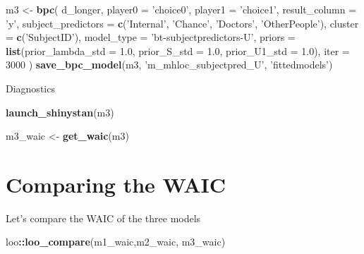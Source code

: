 \documentclass[
]{book}
\newenvironment{Shaded}{\begin{snugshade}}{\end{snugshade}}
\newcommand{\DataTypeTok}[1]{\textcolor[rgb]{0.13,0.29,0.53}{#1}}
\newcommand{\DecValTok}[1]{\textcolor[rgb]{0.00,0.00,0.81}{#1}}
\newcommand{\FloatTok}[1]{\textcolor[rgb]{0.00,0.00,0.81}{#1}}
\newcommand{\KeywordTok}[1]{\textcolor[rgb]{0.13,0.29,0.53}{\textbf{#1}}}
\newcommand{\NormalTok}[1]{#1}
\newcommand{\OperatorTok}[1]{\textcolor[rgb]{0.81,0.36,0.00}{\textbf{#1}}}
\newcommand{\StringTok}[1]{\textcolor[rgb]{0.31,0.60,0.02}{#1}}
\begin{document}
\begin{Shaded}
\begin{Highlighting}[]
\NormalTok{m3 <-}
\StringTok{  }\KeywordTok{bpc}\NormalTok{(}
\NormalTok{    d_longer,}
    \DataTypeTok{player0 =} \StringTok{'choice0'}\NormalTok{,}
    \DataTypeTok{player1 =} \StringTok{'choice1'}\NormalTok{,}
    \DataTypeTok{result_column =} \StringTok{'y'}\NormalTok{,}
    \DataTypeTok{subject_predictors =} \KeywordTok{c}\NormalTok{(}\StringTok{'Internal'}\NormalTok{, }\StringTok{'Chance'}\NormalTok{, }\StringTok{'Doctors'}\NormalTok{, }\StringTok{'OtherPeople'}\NormalTok{),}
    \DataTypeTok{cluster =} \KeywordTok{c}\NormalTok{(}\StringTok{'SubjectID'}\NormalTok{),}
    \DataTypeTok{model_type =} \StringTok{'bt-subjectpredictors-U'}\NormalTok{,}
    \DataTypeTok{priors =} \KeywordTok{list}\NormalTok{(}\DataTypeTok{prior_lambda_std =} \FloatTok{1.0}\NormalTok{,}
                  \DataTypeTok{prior_S_std =} \FloatTok{1.0}\NormalTok{,}
                  \DataTypeTok{prior_U1_std =} \FloatTok{1.0}\NormalTok{),}
    \DataTypeTok{iter =} \DecValTok{3000}
\NormalTok{  )}
\KeywordTok{save_bpc_model}\NormalTok{(m3, }\StringTok{'m_mhloc_subjectpred_U'}\NormalTok{, }\StringTok{'fittedmodels'}\NormalTok{)}
\end{Highlighting}
\end{Shaded}

Diagnostics

\begin{Shaded}
\begin{Highlighting}[]
\KeywordTok{launch_shinystan}\NormalTok{(m3)}
\end{Highlighting}
\end{Shaded}

\begin{Shaded}
\begin{Highlighting}[]
\NormalTok{m3_waic <-}\StringTok{ }\KeywordTok{get_waic}\NormalTok{(m3)}
\end{Highlighting}
\end{Shaded}

\hypertarget{comparing-the-waic}{%
\section{Comparing the WAIC}\label{comparing-the-waic}}

Let's compare the WAIC of the three models

\begin{Shaded}
\begin{Highlighting}[]
\NormalTok{loo}\OperatorTok{::}\KeywordTok{loo_compare}\NormalTok{(m1_waic,m2_waic, m3_waic)}
\end{Highlighting}
\end{Shaded}
\end{document}
